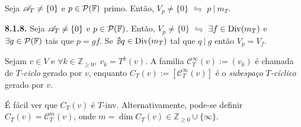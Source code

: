 \begin{proposition}
    \label{prop:8.1.7}
    Seja \(\mathscr{A}_{T} \neq \{0\}\) e \(p \in \mathcal{P}(\mathbb{F})\) primo. Então, \(V_p \neq \{0\}\) \(\leftrightharpoons\) \(p\ | \ m_T\). 
\end{proposition}


\begin{corollary}
    \label{coro:8.1.8}
    \textbf{8.1.8.} Seja \(\mathscr{A}_{T} \neq \{0\}\) e \(p \in \mathcal{P}(\mathbb{F})\). Então, \(V_p\neq \{0\}\) \(\leftrightharpoons\) \(\exists f \in \operatorname{Div}(m_T)\) e \(\exists g \in \mathcal{P}(\mathbb{F})\) tais que \(p = gf\). Se \(\nexists q \in \operatorname{Div}(m_T)\) tal que \(q \ | \ g\) então \(V_p = V_f\). 
\end{corollary}


\begin{definition}
    Sejam \(v\in V\) e \(\forall k \in \mathbb{Z}_{\geq 0}, \ v_k = T^k(v)\). A familia \(\mathscr{C}^\infty_T(v):= (v_k)\)  é chamada de \(T\)\emph{-ciclo} gerado por \(v\), enquanto \(C_T(v) := [\mathscr{C}^\infty_T(v)]\) é o \emph{subespaço} \(T\)\emph{-cíclico} gerado por \(v\). 
\end{definition}

\begin{note}
    É fácil ver que \(C_T(v)\) é \(T\)-inv. Alternativamente, pode-se definir \(C_T(v) = \mathscr{C}_T^m(v)  \), onde \(m = \dim C_T(v) \in \mathbb{Z}_{\geq 0} \cup \{\infty\}\). 
\end{note}


